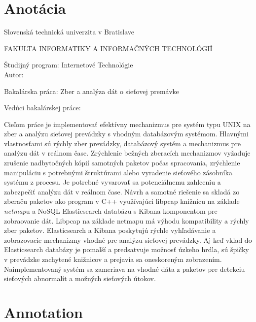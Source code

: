 
\thispagestyle{empty}

\section*{Anotácia}


\noindent
Slovenská technická univerzita v Bratislave

\noindent
FAKULTA INFORMATIKY A INFORMAČNÝCH TECHNOLÓGIÍ

\noindent
Študijný program: Internetové Technológie\\

\noindent
Autor: \myName

\noindent
Bakalárska práca: Zber a analýza dát o sieťovej premávke

\noindent
Vedúci bakalárskej práce: \mySupervisor

\noindent
\myDate%

\bigskip{}

\noindent
Cieľom práce je implementovať efektívny mechanizmus pre systém typu UNIX na zber a analýzu sieťovej prevádzky s vhodným databázovým systémom. Hlavnými vlastnosťami sú rýchly zber prevádzky, databázový systém a mechanizmus pre analýzu dát v reálnom čase. Zrýchlenie bežných zberacích mechanizmov vyžaduje zrušenie nadbytočných kópií samotných paketov počas spracovania, zrýchlenie manipuláciu s potrebnými štruktúrami alebo vyradenie sieťového zásobníka systému z procesu. Je potrebné vyvarovať sa potenciálnemu zahlceniu a zabezpečiť analýzu dát v reálnom čase. Návrh a samotné riešenie sa skladá zo zberaču paketov ako program v C++ vy\-u\-ží\-va\-jú\-ci libpcap knižnicu na základe \emph{netmap}u a NoSQL Elasticsearch databázu s Kibana komponentom pre zobraovanie dát. Libpcap na základe netmapu má výhodu kompatibility a rýchly zber paketov. Elasticsearch a Kibana poskytujú rýchle vyhľadávanie a zobrazovacie mechanizmy vhodné pre analýzu sieťovej prevádzky. Aj keď vklad do Elasticsearch databázy je pomalší a predsatvuje možnosť úzkeho hrdla, sú špičky v prevádzke zachytené knižnicov a prejavia sa oneskoreným zobrazením. Naimplementovaný systém sa zameriava na vhodné dáta z paketov pre detekciu sieťových abnormalít a možných sieťových útokov.

\newpage{}\thispagestyle{empty}

\newpage
\thispagestyle{empty}
\mbox{}
\newpage

\thispagestyle{empty}
\section*{Annotation}

